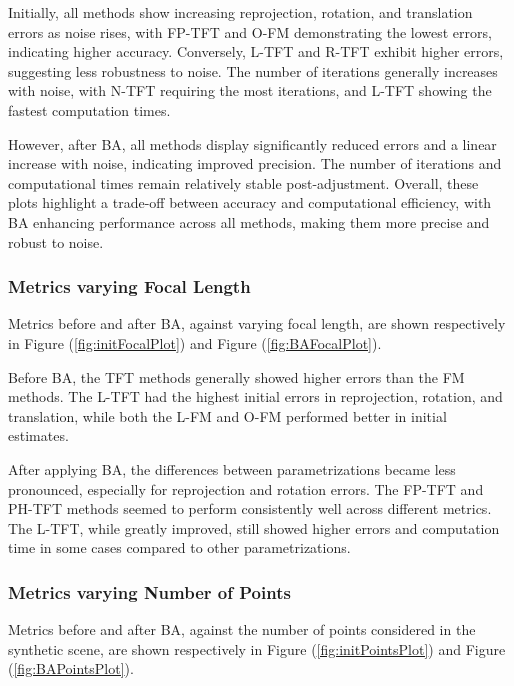 Initially, all methods show increasing reprojection, rotation, and translation errors as noise rises, with \acs{FP-TFT} and \acs{O-FM} demonstrating the lowest errors, indicating higher accuracy. Conversely, \acs{L-TFT} and \acs{R-TFT} exhibit higher errors, suggesting less robustness to noise. The number of iterations generally increases with noise, with \acs{N-TFT} requiring the most iterations, and \acs{L-TFT} showing the fastest computation times.

However, after \acs{BA}, all methods display significantly reduced errors and a linear increase with noise, indicating improved precision. The number of iterations and computational times remain relatively stable post-adjustment. Overall, these plots highlight a trade-off between accuracy and computational efficiency, with \acs{BA} enhancing performance across all methods, making them more precise and robust to noise.\\

\subsubsection*{Metrics varying Focal Length}
Metrics before and after \acs{BA}, against varying focal length, are shown respectively in Figure (\ref{fig:initFocalPlot}) and Figure (\ref{fig:BAFocalPlot}).

Before \acs{BA}, the \acs{TFT} methods generally showed higher errors than the \acs{FM} methods. The \acs{L-TFT} had the highest initial errors in reprojection, rotation, and translation, while both the \acs{L-FM} and \acs{O-FM} performed better in initial estimates.

After applying \acs{BA}, the differences between parametrizations became less pronounced, especially for reprojection and rotation errors. The \acs{FP-TFT} and \acs{PH-TFT} methods seemed to perform consistently well across different metrics. The \acs{L-TFT}, while greatly improved, still showed higher errors and computation time in some cases compared to other parametrizations.\\

\subsubsection*{Metrics varying Number of Points}
Metrics before and after \acs{BA}, against the number of points considered in the synthetic scene, are shown respectively in Figure (\ref{fig:initPointsPlot}) and Figure (\ref{fig:BAPointsPlot}).

